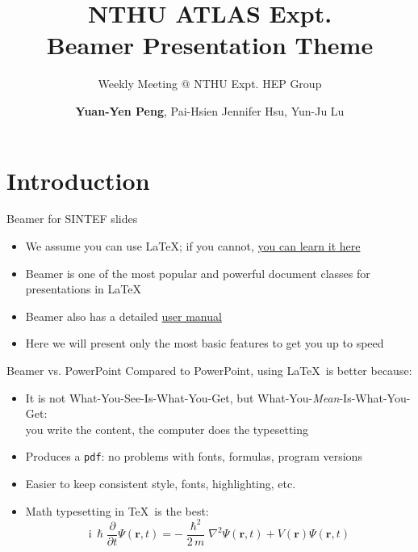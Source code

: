 \documentclass[12pt,aspectratio=169]{beamer}
\title{NTHU ATLAS Expt.\\
Beamer Presentation Theme}
\subtitle{Weekly Meeting @ NTHU Expt. HEP Group}
\author{\textbf{Yuan-Yen Peng}, Pai-Hsien Jennifer Hsu, Yun-Ju Lu}
\begin{document}
\maketitle

\section{Introduction}

\begin{frame}{Beamer for SINTEF slides}{\thesection \, \secname}
    \begin{itemize}
        \item We assume you can use \LaTeX; if you cannot,
        \href{http://en.wikibooks.org/wiki/LaTeX/}{you can learn it here}
        \item Beamer is one of the most popular and powerful document
        classes for presentations in \LaTeX
        \item Beamer also has a detailed
        \href{http://www.ctan.org/tex-archive/macros/latex/contrib/beamer/doc/beameruserguide.pdf}{user manual}
        \item Here we will present only the most basic features to get you up to speed
    \end{itemize}
\end{frame}

\begin{frame}{Beamer vs. PowerPoint}
Compared to PowerPoint, using \LaTeX\ is better because:
    \begin{itemize}
        \item It is not What-You-See-Is-What-You-Get, but
        What-You-\emph{Mean}-Is-What-You-Get:\\
        you write the content, the computer does the typesetting
        \item Produces a \texttt{pdf}: no problems with fonts, formulas,
              program versions
        \item Easier to keep consistent style, fonts, highlighting, etc.
        \item Math typesetting in \TeX\ is the best:
            \begin{equation*}
                \mathrm{i}\,\hslash\frac{\partial}{\partial t} \Psi(\mathbf{r},t) =
                -\frac{\hslash^2}{2\,m}\nabla^2\Psi(\mathbf{r},t)
                + V(\mathbf{r})\Psi(\mathbf{r},t)
            \end{equation*}
    
    \end{itemize}
\end{frame}
\end{document}
